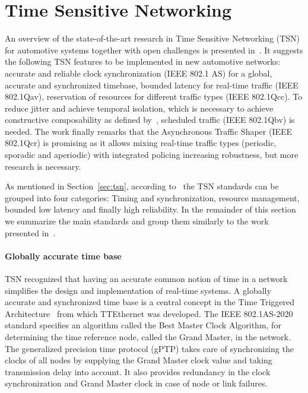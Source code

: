 \section{Time Sensitive Networking}
\label{appendix:tsn}
An overview of the state-of-the-art research in Time Sensitive Networking (TSN) for automotive systems together with open challenges is presented in~\cite{ashjaei2021time}. It suggests the following TSN features to be implemented in new automotive networks: accurate and reliable clock synchronization (IEEE 802.1 AS) for a global, accurate and synchronized timebase, bounded latency for real-time traffic (IEEE 802.1Qav), reservation of resources for different traffic types (IEEE 802.1Qcc). To reduce jitter and achieve temporal isolation, which is necessary to achieve constructive composability as defined by~\cite{kopetz2003time}, scheduled traffic (IEEE 802.1Qbv) is needed. The work finally remarks that the Asynchronous Traffic Shaper (IEEE 802.1Qcr) is promising as it allows mixing real-time traffic types (periodic, sporadic and aperiodic) with integrated policing increasing robustness, but more research is necessary.

As mentioned in Section~\ref{sec:tsn}, according to~\cite{ashjaei2021time} the TSN standards can be grouped into four categories: Timing and synchronization, resource management, bounded low latency and finally high reliability. In the remainder of this section we summarize the main standards and group them similarly to the work presented in~\cite{ashjaei2021time}.

\paragraph{Globally accurate time base} TSN recognized that having an accurate common notion of time in a network simplifies the design and implementation of real-time systems. A globally accurate and synchronized time base is a central concept in the Time Triggered Architecture~\cite{kopetz2003time} from which TTEthernet was developed. The IEEE 802.1AS-2020~\cite{IEEE8021AS} standard specifies an algorithm called the Best Master Clock Algorithm, for determining the time reference node, called the Grand Master, in the network. The generalized precision time protocol (gPTP) takes care of synchronizing the clocks of all nodes by supplying the Grand Master clock value and taking transmission delay into account. It also provides redundancy in the clock synchronization and Grand Master clock in case of node or link failures.

